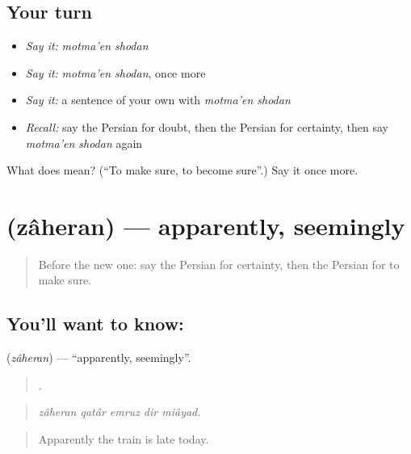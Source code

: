 \subsection*{Your turn}
\begin{itemize}
\raggedright
  \item \emph{Say it:} \emph{motma'en shodan}
  \item \emph{Say it:} \emph{motma'en shodan}, once more
  \item \emph{Say it:} a sentence of your own with \emph{motma'en shodan}
  \item \emph{Recall:} say the Persian for doubt, then the Persian for certainty, then say \emph{motma'en shodan} again
\end{itemize}

\begin{tcolorbox}[breakable,colback=teal!4,colframe=teal!35!black,title={Before you move on}]
What does   mean? (\textquotedblleft{}To make sure, to become sure\textquotedblright{}.) Say it once more.
\end{tcolorbox}
\section[\texorpdfstring{\fa{ظاهرا} (zâheran)}{ظاهرا (zâheran)}]{ (zâheran) — apparently, seemingly}

\label{lesson:FA-C393-zaheran}



\begin{quote}
Before the new one: say the Persian for certainty, then the Persian for to make sure.
\end{quote}

\subsection*{You'll want to know: }
\textbf{} (\emph{zâheran}) — \textquotedblleft{}apparently, seemingly\textquotedblright{}.

\begin{quote}
    .
\end{quote}

\begin{quote}
\emph{zâheran qatâr emruz dir miâyad.}
\end{quote}

\begin{quote}
Apparently the train is late today.
\end{quote}


